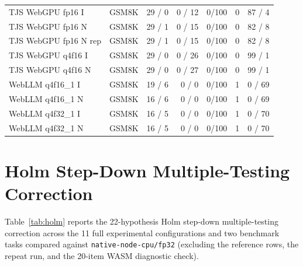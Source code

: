 \documentclass[conference]{IEEEtran}
\begin{document}
\begin{table}[!t]
\begin{tabular}{@{}llrrrrr@{}}
TJS WebGPU fp16 I & GSM8K & 29 / 0 & 0 / 12 & 0/100 & 0 & 87 / 4\\
TJS WebGPU fp16 N & GSM8K & 29 / 1 & 0 / 15 & 0/100 & 0 & 82 / 8\\
TJS WebGPU fp16 N rep & GSM8K & 29 / 1 & 0 / 15 & 0/100 & 0 & 82 / 8\\
TJS WebGPU q4f16 I & GSM8K & 29 / 0 & 0 / 26 & 0/100 & 0 & 99 / 1\\
TJS WebGPU q4f16 N & GSM8K & 29 / 0 & 0 / 27 & 0/100 & 0 & 99 / 1\\
WebLLM q4f16\_1 I & GSM8K & 19 / 6 & 0 / 0 & 0/100 & 1 & 0 / 69\\
WebLLM q4f16\_1 N & GSM8K & 16 / 6 & 0 / 0 & 0/100 & 1 & 0 / 69\\
WebLLM q4f32\_1 I & GSM8K & 16 / 5 & 0 / 0 & 0/100 & 1 & 0 / 70\\
WebLLM q4f32\_1 N & GSM8K & 16 / 5 & 0 / 0 & 0/100 & 1 & 0 / 70\\
\bottomrule
\end{tabular}
\end{table}

\section{Holm Step-Down Multiple-Testing Correction}
\label{app:holm}

Table~\ref{tab:holm} reports the 22-hypothesis Holm step-down
multiple-testing correction across the 11 full experimental
configurations and two benchmark tasks compared against
\texttt{native-node-cpu/fp32} (excluding the reference rows,
the repeat run, and the 20-item WASM diagnostic check).
\end{document}
